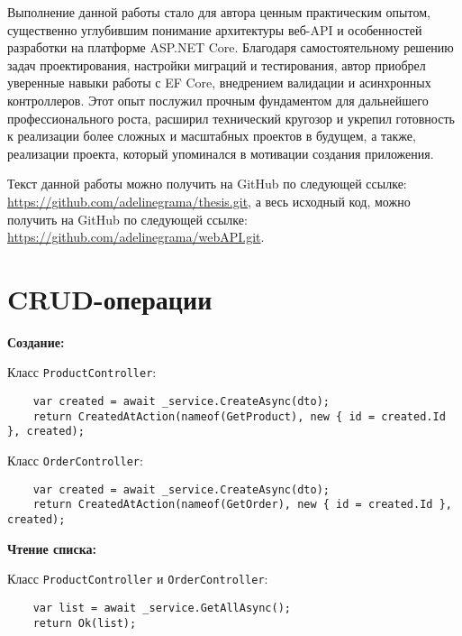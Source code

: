 \documentclass[a4paper,12pt]{report}
\renewcommand{\year}{2025}
\newcommand{\conferencesList}{Conferința Studențească, Editia XXVIII-a, \year}
\newcommand{\githubthesis}{\url{https://github.com/adelinegrama/thesis.git}}
\newcommand{\githubwebAPI}{\url{https://github.com/adelinegrama/webAPI.git}}
\begin{document}
Выполнение данной работы стало для автора ценным практическим опытом, существенно углубившим понимание 
архитектуры веб-\acs{API} и особенностей разработки на платформе ASP.NET Core. 
Благодаря самостоятельному решению задач проектирования, настройки миграций и тестирования, 
автор приобрел уверенные навыки работы с \acs{EF} Core, внедрением валидации и асинхронных контроллеров. 
Этот опыт послужил прочным фундаментом для дальнейшего профессионального роста, расширил технический 
кругозор и укрепил готовность к реализации более сложных и масштабных проектов в будущем, а также, 
реализации проекта, который упоминался в мотивации создания приложения.


Текст данной работы можно получить на GitHub по следующей ссылке: \githubthesis, 
а весь исходный код, можно получить на GitHub по следующей ссылке: \githubwebAPI.


\newpage
{}







\section{\acs{CRUD}-операции}\label{crud}

\textbf{Создание:}

Класс \texttt{ProductController}:
\begin{verbatim}
    var created = await _service.CreateAsync(dto);
    return CreatedAtAction(nameof(GetProduct), new { id = created.Id }, created);
\end{verbatim}

Класс \texttt{OrderController}:
\begin{verbatim}
    var created = await _service.CreateAsync(dto);
    return CreatedAtAction(nameof(GetOrder), new { id = created.Id }, created);
\end{verbatim}

\textbf{Чтение списка:}

Класс \texttt{ProductController} и \texttt{OrderController}:
\begin{verbatim}
    var list = await _service.GetAllAsync();
    return Ok(list);
\end{verbatim}
\end{document}
